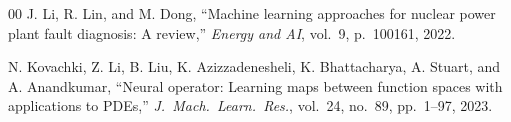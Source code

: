 \documentclass[conference]{IEEEtran}
\begin{document}
\begin{thebibliography}{00}
J. Li, R. Lin, and M. Dong,
``Machine learning approaches for nuclear power plant fault diagnosis: A review,''
\textit{Energy and AI}, vol.~9, p.~100161, 2022.

N. Kovachki, Z. Li, B. Liu, K. Azizzadenesheli, K. Bhattacharya, A. Stuart, and A. Anandkumar,
``Neural operator: Learning maps between function spaces with applications to PDEs,''
\textit{J.\ Mach.\ Learn.\ Res.}, vol.~24, no.~89, pp.~1--97, 2023.

\end{thebibliography}
\end{document}
